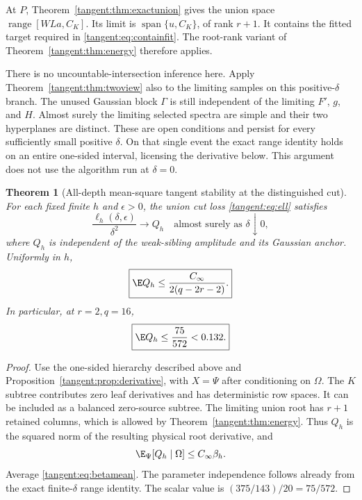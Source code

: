 \documentclass[11pt,oneside,openany,a4paper]{book}
\numberwithin{equation}{chapter}
\newtheorem{theorem}{Theorem}[chapter]
\theoremstyle{definition}
\theoremstyle{remark}
\DeclareMathOperator{\ran}{range}\DeclareMathOperator{\OPT}{OPT}
\begin{document}
At $P$, Theorem~\ref{tangent:thm:exactunion} gives the union space $\ran[WLa,C_K]$. Its limit is $\operatorname{span}\{u,C_K\}$, of rank $r+1$. It contains the fitted target required in \eqref{tangent:eq:containfit}. The root-rank variant of Theorem~\ref{tangent:thm:energy} therefore applies.

There is no uncountable-intersection inference here. Apply Theorem~\ref{tangent:thm:twoview} also to the limiting samples on this positive-$\delta$ branch. The unused Gaussian block $\Gamma$ is still independent of the limiting $F'$, $g$, and $H$. Almost surely the limiting selected spectra are simple and their two hyperplanes are distinct. These are open conditions and persist for every sufficiently small positive $\delta$. On that single event the exact range identity holds on an entire one-sided interval, licensing the derivative below. This argument does not use the algorithm run at $\delta=0$.

\begin{theorem}[All-depth mean-square tangent stability at the distinguished cut]\label{tangent:thm:applied}
For each fixed finite $h$ and $\epsilon>0$, the union cut loss \eqref{tangent:eq:ell} satisfies
\begin{equation}\label{tangent:eq:Qdef}
 \frac{\ell_h(\delta,\epsilon)}{\delta^2}\longrightarrow Q_h
 \quad\text{almost surely as }\delta\downarrow0,
\end{equation}
where $Q_h$ is independent of the weak-sibling amplitude and its Gaussian anchor. Uniformly in $h$,
\begin{equation}\label{tangent:eq:Qbound}
 \boxed{\E Q_h\le\frac{C_\infty}{2(q-2r-2)}.}
\end{equation}
In particular, at $r=2,q=16$,
\begin{equation}\label{tangent:eq:number}
 \boxed{\E Q_h\le\frac{75}{572}<0.132.}
\end{equation}
\end{theorem}
\begin{proof}
Use the one-sided hierarchy described above and Proposition~\ref{tangent:prop:derivative}, with $X=\Psi$ after conditioning on $\Omega$. The $K$ subtree contributes zero leaf derivatives and has deterministic row spaces. It can be included as a balanced zero-source subtree. The limiting union root has $r+1$ retained columns, which is allowed by Theorem~\ref{tangent:thm:energy}. Thus $Q_h$ is the squared norm of the resulting physical root derivative, and
\[
 \E_\Psi[Q_h\mid\Omega]\le C_\infty\beta_h.
\]
Average \eqref{tangent:eq:betamean}. The parameter independence follows already from the exact finite-$\delta$ range identity. The scalar value is $(375/143)/20=75/572$.
\end{proof}
\end{document}
